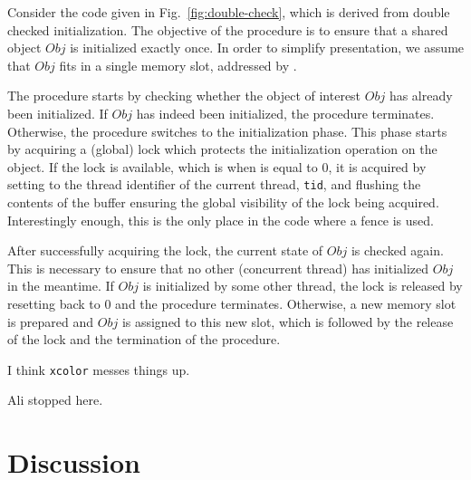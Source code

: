 \documentclass[preprint,9pt]{sigplanconf}
\begin{document}
Consider the code given in Fig.~\ref{fig:double-check}, which is derived from double checked initialization.
The objective of the procedure is to ensure that a shared object $Obj$ is initialized exactly once.
In order to simplify presentation, we assume that $Obj$ fits in a single memory slot, addressed by {}.

The procedure starts by checking whether the object of interest $Obj$ has already been initialized.
If $Obj$ has indeed been initialized, the procedure terminates.
Otherwise, the procedure switches to the initialization phase.
This phase starts by acquiring a (global) lock which protects the initialization operation on the object.
If the lock is available, which is when {} is equal to 0, it is acquired by setting {} to the thread identifier of the current thread, {\tt tid}, and flushing the contents of the buffer ensuring the global visibility of the lock being acquired.
Interestingly enough, this is the only place in the code where a fence is used.

After successfully acquiring the lock, the current state of $Obj$ is checked again.
This is necessary to ensure that no other (concurrent thread) has initialized $Obj$ in the meantime.
If $Obj$ is initialized by some other thread, the lock is released by resetting {} back to 0 and the procedure terminates.
Otherwise, a new memory slot is prepared and $Obj$ is assigned to this new slot, which is followed by the release of the lock and the termination of the procedure.

I think {\tt xcolor} messes things up.




{\sc \color{red} Ali stopped here.}






\section{Discussion}
\end{document}
